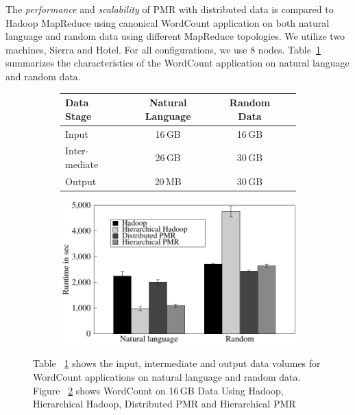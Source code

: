 \documentclass[]{paper}
\begin{document}
The \textit{performance} and \textit{scalability} of PMR with distributed data is compared to Hadoop MapReduce using canonical WordCount application on both natural language and random data using different MapReduce topologies.  We utilize two machines, Sierra and Hotel. For all configurations, we use 8 nodes. Table~\ref{tab:data-volumes} summarizes the characteristics of the WordCount application on natural language and random data.

\begin{figure}[t]
	\begin{subfigure}[b]{0.5\textwidth}
                \centering
                \begin{tabular}{|p{1cm}|c|c|c|}
\hline
\textbf{Data Stage}&\textbf{Natural Language}&\textbf{Random Data}\\
\hline
Input  &16\,GB&16\,GB\\
\hline
Inter-mediate &26\,GB&30\,GB\\ 
\hline
Output &20\,MB&30\,GB\\
\hline
\end{tabular}
		
                \caption{}
                \label{tab:data-volumes}
        \end{subfigure}
	\begin{subfigure}[b]{0.5\textwidth}
                \centering
                \includegraphics[width=1\textwidth]{figures/allmrs_rands.pdf}
                \caption{}
                \label{fig:allmrs_rands}
        \end{subfigure}

	\caption{Table ~\ref{tab:data-volumes} shows the input, intermediate and output data volumes for WordCount applications on natural language and random data. Figure ~\ref{fig:allmrs_rands} shows WordCount on 16\,GB Data Using Hadoop, Hierarchical Hadoop, Distributed PMR  and Hierarchical PMR}
	\label{fig:combo_1}

\end{figure}
\end{document}
